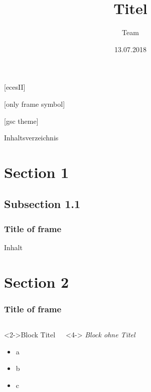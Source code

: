 \documentclass[table]{beamer}
\title[]{ Titel \\
\footnotesize\sf {Teammember 1, Teammember 2, Teammember 3}}
\author[Teammember 1 | Teammember 2 | Teammember 3 ]{Team}
\date[]{13.07.2018}
\begin{document}
[ecesII]

[only frame symbol]

[gsc theme]

\setcounter{tocdepth}{1}
\begin{frame}{Inhaltsverzeichnis}
\tableofcontents
\end{frame}
\setcounter{tocdepth}{2}

\section{Section 1}
\subsection{Subsection 1.1}
	\begin{frame}
	\frametitle{Title of frame}
 		Inhalt
	\end{frame}	
\section{Section 2}
	\begin{frame}
	\frametitle{Title of frame}
	\begin{columns}[T]
			\begin{block}<2->{Block Titel}
				\begin{itemize}
					\item<3-> a
					\item<3-> b
					\item<3-> c
				\end{itemize}
			\end{block}
			\begin{block}<4->{}
				\emph{Block ohne Titel}
			\end{block}
	\end{columns}
	\end{frame}
\end{document}
